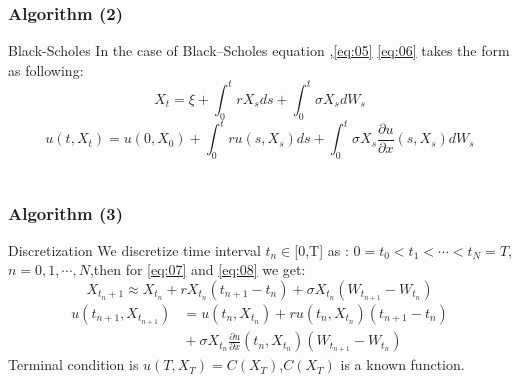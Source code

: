\documentclass[mathserif,10pt]{beamer}
\begin{document}
\begin{frame}
\frametitle{Algorithm (2)}
\begin{block}{Black-Scholes}
In the case of  Black–Scholes equation ,\eqref{eq:05} \eqref{eq:06} takes the form as following:
\begin{equation}
\label{eq:07}
X_t=\xi+\int_{0}^{t}rX_sds+\int_{0}^{t}\sigma X_sdW_s
\end{equation}
\begin{equation}
\label{eq:08}
    u(t,X_t)=u(0,X_0)+\int_{0}^{t}ru(s,X_s)ds
    +\int_{0}^{t}\sigma X_s \frac{\partial u}{\partial x}(s,X_s)dW_s
\end{equation}\\
\end{block}
\end{frame}

\begin{frame}
\frametitle{Algorithm (3)} 
\begin{block}{Discretization}
We discretize time interval $t_n\in$[0,T] as :
$0=t_0<t_1<\cdots <t_N=T$, $n=0,1,\cdots,N$,then for \eqref{eq:07} and \eqref{eq:08} we get:
\begin{equation}
\label{eq:11}
X_{t_n+1}\approx X_{t_n}+rX_{t_n} (t_{n+1}-t_n)
  +\sigma X_{t_n}(W_{t_{n+1}}-W_{t_n})
\end{equation}
\begin{align}
u(t_{n+1},X_{t_{n+1}})& =u(t_{n},X_{t_{n}})
+ru(t_{n},X_{t_{n}})(t_{n+1}-t_{n}) \nonumber \\
&{} +\sigma X_{t_n}\frac{\partial u}{\partial x}(t_n,X_{t_n})(W_{t_{n+1}}-W_{t_{n}})
\label{eq:12}
\end{align}
Terminal condition is $u(T,X_T)=C(X_T)$,$C(X_T)$ is a known function.
\end{block}
\end{frame}
\end{document}
